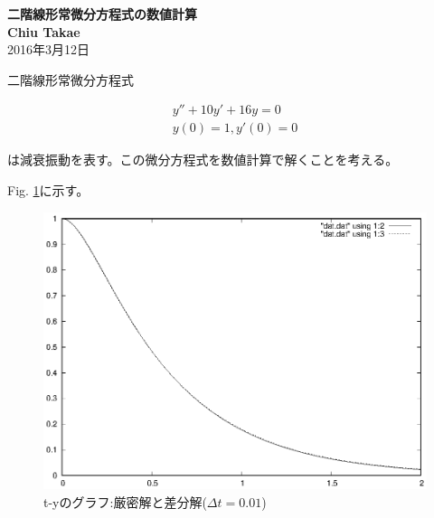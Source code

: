 \documentclass[notitlepage,11pt]{jsarticle}
\newcommand{\rfig}[1]{Fig. \ref{#1}}
\begin{document}
\begin{center}
{\bf \Large 二階線形常微分方程式の数値計算} \\
\vspace{15pt}
{\bf Chiu Takae}\\				%
\vspace{15pt}
{\large 2016年3月12日} 	%

\end{center}


\vspace{2zw}

二階線形常微分方程式

\begin{eqnarray}
y'' + 10y' + 16y = 0 \\
y(0) = 1, y'(0) = 0
\end{eqnarray}

は減衰振動を表す。この微分方程式を数値計算で解くことを考える。

\rfig{fig:1}に示す。

\begin{figure}[!h]
	\centering
	\includegraphics[width=150mm,clip]{ode1_1.eps}
	\flushright
	\vspace{-15pt}
	\caption{t-yのグラフ:厳密解と差分解($\Delta t=0.01$)}
	 \label{fig:1}
\end{figure}






\end{document}

